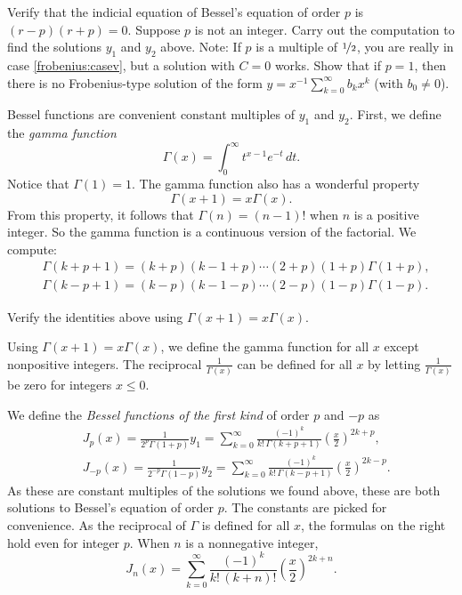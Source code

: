 \begin{exercise}
\leavevmode
\begin{tasks}
\task
Verify that the indicial equation of Bessel's equation of order $p$ is
$(r-p)(r+p)=0$.
\task
Suppose $p$ is not an integer.  Carry out the computation
to find the solutions $y_1$ and $y_2$ above.
Note: If $p$ is a multiple of $\nicefrac{1}{2}$,
you are really in case \ref{frobenius:casev}, but a solution with $C=0$
works.
\task
Show that if $p=1$, then there is no Frobenius-type solution
of the form $y = x^{-1} \sum_{k=0}^\infty b_k x^{k}$ (with $b_0 \neq 0$).
\end{tasks}
\end{exercise}

Bessel functions are convenient constant multiples of $y_1$ and $y_2$.
First, we define the \emph{gamma function}
\begin{equation*}
\Gamma(x) = \int_0^\infty t^{x-1} e^{-t} \, dt .
\end{equation*}
Notice that $\Gamma(1) = 1$.
The gamma function also has a wonderful property
\begin{equation*}
\Gamma(x+1) = x \Gamma(x) .
\end{equation*}
From this property, it follows that $\Gamma(n) = (n-1)!$ when $n$ is a
positive integer.  So the gamma function is a continuous version of the factorial.  We
compute:
\begin{align*}
& \Gamma(k+p+1)=(k+p)(k-1+p)\cdots (2+p)(1+p) \Gamma(1+p) ,
\\
& \Gamma(k-p+1)=(k-p)(k-1-p)\cdots (2-p)(1-p) \Gamma(1-p) .
\end{align*}

\begin{exercise}
Verify the identities above using 
$\Gamma(x+1) = x \Gamma(x)$.
\end{exercise}

Using $\Gamma(x+1) = x \Gamma(x)$,
we define the gamma function for 
all $x$ except nonpositive integers. 
The reciprocal $\frac{1}{\Gamma(x)}$
can be defined for all $x$ by letting $\frac{1}{\Gamma(x)}$ be zero
for integers $x \leq 0$.

We define the \emph{Bessel functions of the first kind}%
 of
order $p$ and $-p$ as
\begin{align*}
& J_p(x) = \frac{1}{2^p\Gamma(1+p)} y_1
=
\sum_{k=0}^\infty
\frac{{(-1)}^k}{k! \, \Gamma(k+p+1)}
{\left(\frac{x}{2}\right)}^{2k+p} ,
\\
& J_{-p}(x) = \frac{1}{2^{-p}\Gamma(1-p)} y_2
=
\sum_{k=0}^\infty
\frac{{(-1)}^k}{k! \,\Gamma(k-p+1)}
{\left(\frac{x}{2}\right)}^{2k-p} .
\end{align*}
As these are constant multiples of the solutions we found above, these are
both solutions to Bessel's equation of order $p$.  The constants are picked
for convenience.
As the reciprocal of $\Gamma$ is defined for all $x$, the formulas
on the right hold even for integer $p$.
When $n$ is a nonnegative integer,
\begin{equation*}
J_n(x) =
\sum_{k=0}^\infty
\frac{{(-1)}^k}{k! \,(k+n)!}
{\left(\frac{x}{2}\right)}^{2k+n} .
\end{equation*}

